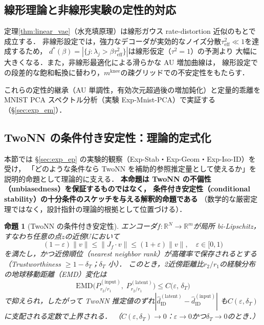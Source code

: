 \documentclass[11pt,a4paper]{jsarticle}
\newtheorem{proposition}{命題}
\newcommand{\R}{\mathbb{R}}
\newcommand{\mknee}{m^{\mathrm{knee}}}
\begin{document}
\subsection{線形理論と非線形実験の定性的対応}\label{sec:theory_bridge}

定理\ref{thm:linear_vae}（水充填原理）は線形ガウス rate-distortion 近似のもとで成立する．
非線形設定では，強力なデコーダが実効的なノイズ分散$\tau^2_\mathrm{eff} \ll 1$を達成するため，
$d^*(\beta) = |\{j : \lambda_j > \beta\tau^2_\mathrm{eff}\}|$は線形仮定（$\tau^2=1$）の予測より
大幅に大きくなる．また，非線形最適化による滑らかな AU 増加曲線は，
線形設定での段差的な飽和転換に替わり，$\mknee$の疎グリッドでの不安定性をもたらす．

これらの定性的継承（AU 単調性，有効次元超過後の増加鈍化）と定量的乖離を
MNIST PCA スペクトル分析（実験 Exp-Mnist-PCA）で実証する（§\ref{sec:exp_em}）．

\subsection{TwoNN の条件付き安定性：理論的定式化}\label{sec:theory_stability}

本節では §\ref{sec:exp_ep} の実験的観察（Exp-Stab・Exp-Geom・Exp-Iso-ID）を受け，
「どのような条件なら TwoNN を補助的参照推定量として使えるか」を
説明的命題として理論的に支える．
\textbf{本命題は TwoNN の不偏性（unbiasedness）を保証するものではなく，
条件付き安定性（conditional stability）の十分条件のスケッチを与える解釈的命題である}
（数学的な厳密定理ではなく，設計指針の理論的根拠として位置づける）．

\begin{proposition}[TwoNN の条件付き安定性]\label{thm:twonn_stability}
エンコーダ$f: \R^N \to \R^m$が局所 bi-Lipschitz，
すなわち任意の点$z$の近傍$U$において
\begin{equation}
  (1-\varepsilon)\|v\| \leq \|J_f \cdot v\| \leq (1+\varepsilon)\|v\|,
  \quad \varepsilon \in [0,1)
  \label{eq:bilip}
\end{equation}
を満たし，かつ近傍順位（nearest neighbor rank）が高確率で保存されるとする
（Trustworthiness $\geq 1 - \delta_T$；$\delta_T$ 小）．
このとき，2近傍距離比$r_2/r_1$の経験分布の地球移動距離（EMD）変化は
\begin{equation}
  \mathrm{EMD}\bigl(P_{r_2/r_1}^{(\mathrm{input})},\; P_{r_2/r_1}^{(\mathrm{latent})}\bigr)
  \leq C\bigl(\varepsilon,\, \delta_T\bigr)
  \label{eq:twonn_stab}
\end{equation}
で抑えられ，したがって TwoNN 推定値のずれ$|\hat{d}_\mathrm{ID}^{(\mathrm{latent})} - \hat{d}_\mathrm{ID}^{(\mathrm{input})}|$
も$C(\varepsilon,\delta_T)$に支配される定数で上界される．
（$C(\varepsilon, \delta_T) \to 0$：$\varepsilon \to 0$かつ$\delta_T \to 0$のとき．）
\end{proposition}
\end{document}
